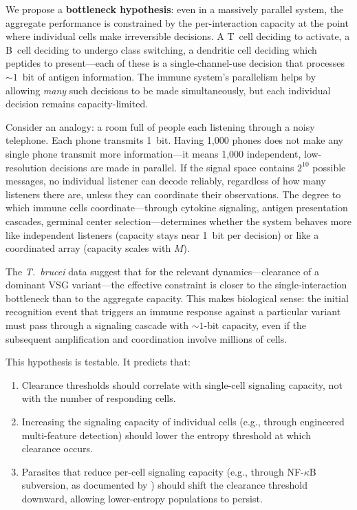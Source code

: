\documentclass[twocolumn,10pt]{article}
\begin{document}
We propose a \textbf{bottleneck hypothesis}: even in a massively parallel system, the aggregate performance is constrained by the per-interaction capacity at the point where individual cells make irreversible decisions.  A T~cell deciding to activate, a B~cell deciding to undergo class switching, a dendritic cell deciding which peptides to present---each of these is a single-channel-use decision that processes ${\sim}1$~bit of antigen information.  The immune system's parallelism helps by allowing \emph{many} such decisions to be made simultaneously, but each individual decision remains capacity-limited.

Consider an analogy: a room full of people each listening through a noisy telephone.  Each phone transmits 1~bit.  Having 1,000 phones does not make any single phone transmit more information---it means 1,000 independent, low-resolution decisions are made in parallel.  If the signal space contains $2^{10}$ possible messages, no individual listener can decode reliably, regardless of how many listeners there are, unless they can coordinate their observations.  The degree to which immune cells coordinate---through cytokine signaling, antigen presentation cascades, germinal center selection---determines whether the system behaves more like independent listeners (capacity stays near 1~bit per decision) or like a coordinated array (capacity scales with $M$).

The \textit{T.~brucei} data suggest that for the relevant dynamics---clearance of a dominant VSG variant---the effective constraint is closer to the single-interaction bottleneck than to the aggregate capacity.  This makes biological sense: the initial recognition event that triggers an immune response against a particular variant must pass through a signaling cascade with ${\sim}1$-bit capacity, even if the subsequent amplification and coordination involve millions of cells.

This hypothesis is testable.  It predicts that:
\begin{enumerate}
\item Clearance thresholds should correlate with single-cell signaling capacity, not with the number of responding cells.
\item Increasing the signaling capacity of individual cells (e.g., through engineered multi-feature detection) should lower the entropy threshold at which clearance occurs.
\item Parasites that reduce per-cell signaling capacity (e.g., through NF-$\kappa$B subversion, as documented by \citealt{rahman2011}) should shift the clearance threshold downward, allowing lower-entropy populations to persist.
\end{enumerate}
\end{document}
